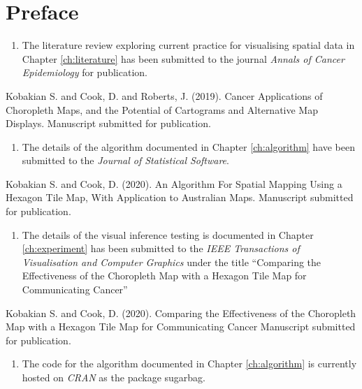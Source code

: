\documentclass{monashthesis}
\begin{document}
\hypertarget{preface}{%
\chapter*{Preface}\label{preface}}

\begin{enumerate}
\def\labelenumi{\arabic{enumi}.}
\tightlist
\item
  The literature review exploring current practice for visualising spatial data in Chapter \ref{ch:literature} has been submitted to the journal \emph{Annals of Cancer Epidemiology} for publication.
\end{enumerate}

Kobakian S. and Cook, D. and Roberts, J. (2019). Cancer Applications of Choropleth Maps, and the Potential of Cartograms and Alternative Map Displays. Manuscript submitted for publication.

\begin{enumerate}
\def\labelenumi{\arabic{enumi}.}
\setcounter{enumi}{1}
\tightlist
\item
  The details of the algorithm documented in Chapter \ref{ch:algorithm} have been submitted to the \emph{Journal of Statistical Software}.
\end{enumerate}

Kobakian S. and Cook, D. (2020). An Algorithm For Spatial Mapping Using a Hexagon Tile Map, With Application to Australian Maps. Manuscript submitted for publication.

\begin{enumerate}
\def\labelenumi{\arabic{enumi}.}
\setcounter{enumi}{2}
\tightlist
\item
  The details of the visual inference testing is documented in Chapter \ref{ch:experiment} has been submitted to the \emph{IEEE Transactions of Visualisation and Computer Graphics} under the title ``Comparing the Effectiveness of the Choropleth Map with a Hexagon Tile Map for Communicating Cancer''
\end{enumerate}

Kobakian S. and Cook, D. (2020). Comparing the Effectiveness of the Choropleth Map
with a Hexagon Tile Map for Communicating Cancer Manuscript submitted for publication.

\begin{enumerate}
\def\labelenumi{\arabic{enumi}.}
\setcounter{enumi}{3}
\tightlist
\item
  The code for the algorithm documented in Chapter \ref{ch:algorithm} is currently hosted on \emph{CRAN} as the package sugarbag.
\end{enumerate}
\end{document}
